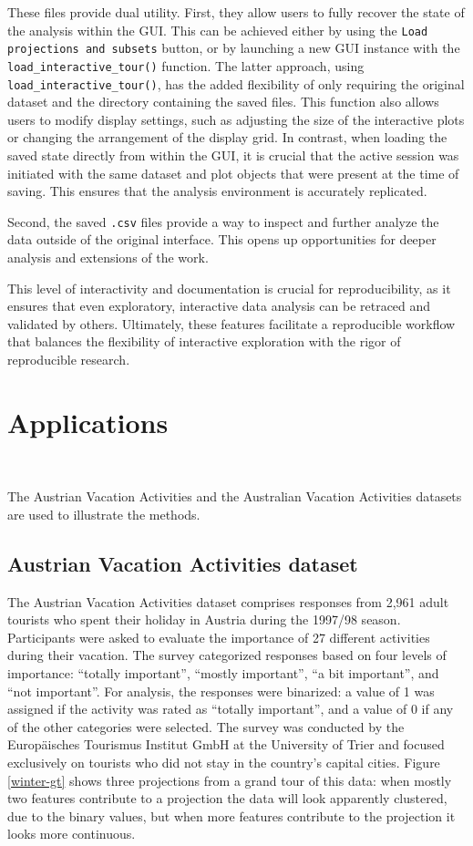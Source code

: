 \documentclass[article]{ajs}
\begin{document}
These files provide dual utility. First, they allow users to fully recover the state of the analysis within the GUI. This can be achieved either by using the \texttt{Load projections and subsets} button, or by launching a new GUI instance with the \texttt{load\_interactive\_tour()} function. The latter approach, using \texttt{load\_interactive\_tour()}, has the added flexibility of only requiring the original dataset and the directory containing the saved files. This function also allows users to modify display settings, such as adjusting the size of the interactive plots or changing the arrangement of the display grid. In contrast, when loading the saved state directly from within the GUI, it is crucial that the active session was initiated with the same dataset and plot objects that were present at the time of saving. This ensures that the analysis environment is accurately replicated.

Second, the saved \texttt{.csv} files provide a way to inspect and further analyze the data outside of the original interface. This opens up opportunities for deeper analysis and extensions of the work.

This level of interactivity and documentation is crucial for reproducibility, as it ensures that even exploratory, interactive data analysis can be retraced and validated by others. Ultimately, these features facilitate a reproducible workflow that balances the flexibility of interactive exploration with the rigor of reproducible research.


\section{Applications}~\label{applications}

The Austrian Vacation Activities \citep{dolnicar2003winter} and the Australian Vacation Activities \cite{cliff2009formative} datasets are used to illustrate the methods.

\subsection{Austrian Vacation Activities dataset}

The Austrian Vacation Activities dataset comprises responses from 2,961 adult tourists who spent their holiday in Austria during the 1997/98 season. Participants were asked to evaluate the importance of 27 different activities during their vacation. The survey categorized responses based on four levels of importance: ``totally important'', ``mostly important'', ``a bit important'', and ``not important''. For analysis, the responses were binarized: a value of 1 was assigned if the activity was rated as ``totally important'', and a value of 0 if any of the other categories were selected. The survey was conducted by the Europäisches Tourismus Institut GmbH at the University of Trier and focused exclusively on tourists who did not stay in the country's capital cities. Figure \ref{winter-gt} shows three projections from a grand tour of this data: when mostly two features contribute to a projection the data will look apparently clustered, due to the binary values, but when more features contribute to the projection it looks more continuous. 
\end{document}
